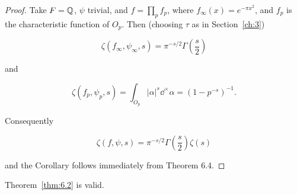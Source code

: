 \begin{proof}

Take $F = \mathbb{Q}$, $\psi$ trivial, and $f = \prod_p f_p$, where $f_{\infty}(x) = e^{-\pi x^2}$, and $f_p$ is the characteristic function of $O_p$. Then (choosing $\tau$ as in Section~\ref{ch:3})

\[
\zeta(f_{\infty}, \psi_{\infty}, s) = \pi^{-s/2}\Gamma\left(\frac{s}{2}\right)
\]

and

\[
\zeta(f_p, \psi_p, s) = \int_{O_p} |\alpha|^s \dd^{\times}\alpha = (1 - p^{-s})^{-1}.
\]

Consequently

\[
\zeta(f, \psi, s) = \pi^{-s/2}\Gamma\left(\frac{s}{2}\right)\zeta(s)
\]

and the Corollary follows immediately from Theorem 6.4.

\end{proof}

\begin{corollary}\label{cor:6.5}

Theorem~\ref{thm:6.2} is valid.

\end{corollary}

